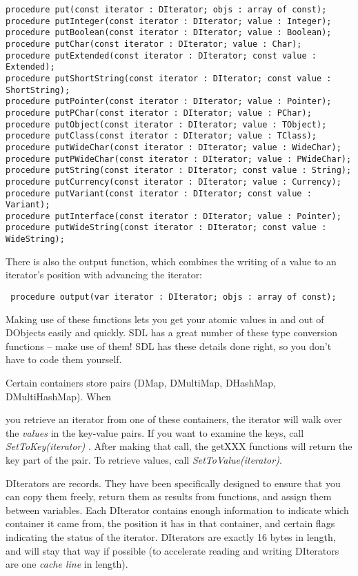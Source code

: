 \documentclass{report}
\begin{document}
\begin{lstlisting}
procedure put(const iterator : DIterator; objs : array of const);
procedure putInteger(const iterator : DIterator; value : Integer);
procedure putBoolean(const iterator : DIterator; value : Boolean);
procedure putChar(const iterator : DIterator; value : Char);
procedure putExtended(const iterator : DIterator; const value : Extended);
procedure putShortString(const iterator : DIterator; const value : ShortString);
procedure putPointer(const iterator : DIterator; value : Pointer);
procedure putPChar(const iterator : DIterator; value : PChar);
procedure putObject(const iterator : DIterator; value : TObject);
procedure putClass(const iterator : DIterator; value : TClass);
procedure putWideChar(const iterator : DIterator; value : WideChar);
procedure putPWideChar(const iterator : DIterator; value : PWideChar);
procedure putString(const iterator : DIterator; const value : String);
procedure putCurrency(const iterator : DIterator; value : Currency);
procedure putVariant(const iterator : DIterator; const value : Variant);
procedure putInterface(const iterator : DIterator; value : Pointer);
procedure putWideString(const iterator : DIterator; const value : WideString);
\end{lstlisting}

There is also the output function, which combines the writing of a value to
an iterator's position with advancing the iterator:

\begin{lstlisting}
 procedure output(var iterator : DIterator; objs : array of const);
\end{lstlisting}

Making use of these functions lets you get your atomic values in and out of
DObjects easily and quickly. SDL has a great number of these type conversion
functions -- make use of them! SDL has these details done right, so you
don't have to code them yourself. 

Certain containers store pairs (DMap, DMultiMap, DHashMap, DMultiHashMap). 
When

you retrieve an iterator from one of these containers, the iterator will
walk over the \emph{values} in the key-value pairs. If you want to examine
the keys, call \emph{SetToKey(iterator)} . After making that call, the
getXXX functions will return the key part of the pair. To retrieve values,
call \emph{SetToValue(iterator)}.

DIterators are records. They have been specifically designed to ensure that
you can copy them freely, return them as results from functions, and assign
them between variables. Each DIterator contains enough information to
indicate which container it came from, the position it has in that
container, and certain flags indicating the status of the iterator.
DIterators are exactly 16 bytes in length, and will stay that way if
possible (to accelerate reading and writing DIterators are one \emph{cache
line} in length).
\end{document}
